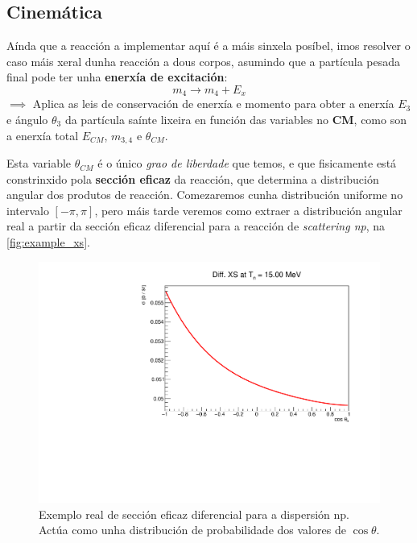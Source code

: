 \documentclass[11pt, a4paper]{article}
\begin{document}
\subsection{Cinemática}
Aínda que a reacción a implementar aquí é a máis sinxela posíbel, imos resolver o caso máis xeral dunha reacción a dous corpos, asumindo que a partícula pesada final pode ter unha \textbf{enerxía de excitación}:
\begin{equation*}
    m_{4} \longrightarrow m_{4} + E_{x}
\end{equation*}
$\implies$ Aplica as leis de conservación de enerxía e momento para obter a enerxía $E_{3}$ e ángulo $\theta_{3}$ da partícula saínte lixeira en función das variables no \textbf{CM}, como son a enerxía total $E_{CM}$, $m_{3,4}$ e $\theta_{CM}$.

Esta variable $\theta_{CM}$ é o único \textit{grao de liberdade} que temos, e que fisicamente está constrinxido pola \textbf{sección eficaz} da reacción, que determina a distribución angular dos produtos de reacción. Comezaremos cunha distribución uniforme no intervalo $\left[-\pi, \pi\right]$, pero máis tarde veremos como extraer a distribución angular real a partir da sección eficaz diferencial para a reacción de \textit{scattering np}, na \autoref{fig:example_xs}.

\begin{figure}[!ht]
    \centering
    \includegraphics[width=0.7\linewidth]{figures/example_xs.pdf}
    \caption{Exemplo real de sección eficaz diferencial para a dispersión np. Actúa como unha distribución de probabilidade dos valores de $\cos{\theta}$.}
    \label{fig:example_xs}
\end{figure}
\end{document}
